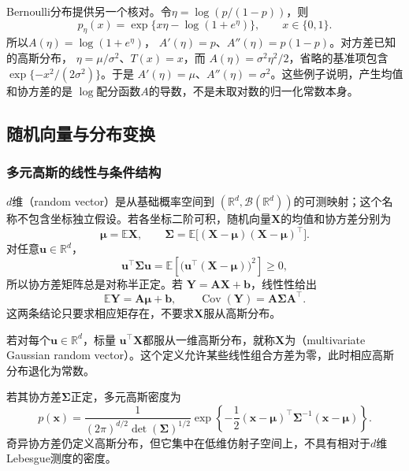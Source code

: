 Bernoulli分布提供另一个核对。令\(\eta=\log(p/(1-p))\)，则
\[
  p_\eta(x)=\exp\{x\eta-\log(1+e^\eta)\},
  \qquad x\in\{0,1\}.
\]
所以\(A(\eta)=\log(1+e^\eta)\)，
\(A'(\eta)=p\)、\(A''(\eta)=p(1-p)\)。对方差已知的高斯分布，
\(\eta=\mu/\sigma^2\)、\(T(x)=x\)，而
\(A(\eta)=\sigma^2\eta^2/2\)，省略的基准项包含
\(\exp\{-x^2/(2\sigma^2)\}\)。于是
\(A'(\eta)=\mu\)、\(A''(\eta)=\sigma^2\)。这些例子说明，产生均值和协方差的是
\(\log\)配分函数\(A\)的导数，不是未取对数的归一化常数本身。

\subsection{随机向量与分布变换}
\label{sec:probability-random-vectors-transformations}

\subsubsection{多元高斯的线性与条件结构}

\(d\)维（random vector）是从基础概率空间到
\((\mathbb{R}^d,\mathcal{B}(\mathbb{R}^d))\)的可测映射；这个名称不包含坐标独立假设。若各坐标二阶可积，随机向量\(\bm{X}\)的均值和协方差分别为
\[ \bm{\mu}=\mathbb{E}\bm{X},
  \qquad\bm{\Sigma}=\mathbb{E}\bigl[(\bm{X}-\bm{\mu})(\bm{X}-\bm{\mu})^{\top}\bigr]. \]
对任意\(\bm{u}\in\mathbb{R}^d\)，
\[
  \bm{u}^{\top}\bm{\Sigma}\bm{u}
  =\mathbb{E}\left[
    \bigl(\bm{u}^{\top}(\bm{X}-\bm{\mu})\bigr)^2
  \right]\geq0,
\]
所以协方差矩阵总是对称半正定。若
\(\bm{Y}=\bm{A}\bm{X}+\bm{b}\)，线性性给出
\[
  \mathbb{E}\bm{Y}=\bm{A}\bm{\mu}+\bm{b},\qquad
  \operatorname{Cov}(\bm{Y})
  =\bm{A}\bm{\Sigma}\bm{A}^{\top}.
\]
这两条结论只要求相应矩存在，不要求\(\bm{X}\)服从高斯分布。

\begin{definition}[多元高斯随机向量]
  \label{def:probability-multivariate-gaussian}
  若对每个\(\bm{u}\in\mathbb{R}^d\)，标量
\(\bm{u}^{\top}\bm{X}\)都服从一维高斯分布，就称\(\bm{X}\)为（multivariate Gaussian random vector）。这个定义允许某些线性组合方差为零，此时相应高斯分布退化为常数。
\end{definition}
若其协方差\(\bm{\Sigma}\)正定，多元高斯密度为
\[
  p(\bm{x})
  =
  \frac{1}{(2\pi)^{d/2}\det(\bm{\Sigma})^{1/2}}
  \exp\left\{
    -\frac12
    (\bm{x}-\bm{\mu})^{\top}
    \bm{\Sigma}^{-1}
    (\bm{x}-\bm{\mu})
  \right\}.
\]
奇异协方差仍定义高斯分布，但它集中在低维仿射子空间上，不具有相对于\(d\)维Lebesgue测度的密度。

